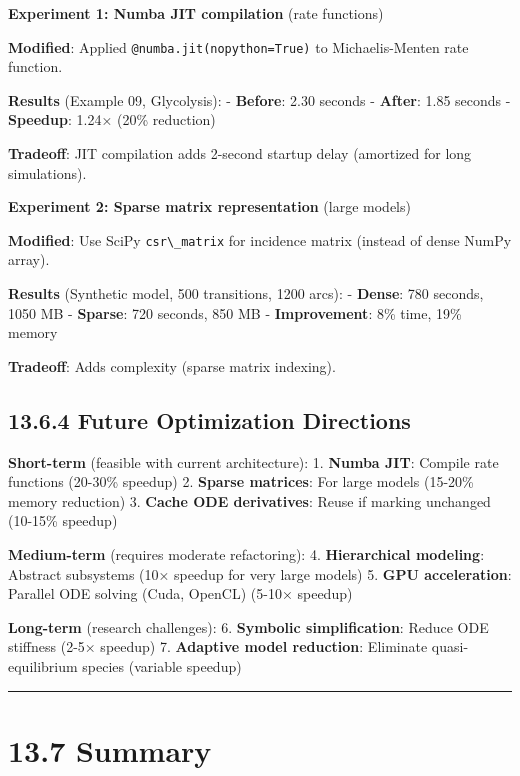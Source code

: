 \textbf{Experiment 1: Numba JIT compilation} (rate functions)

\textbf{Modified}: Applied
\passthrough{\lstinline!@numba.jit(nopython=True)!} to Michaelis-Menten
rate function.

\textbf{Results} (Example 09, Glycolysis): - \textbf{Before}: 2.30
seconds - \textbf{After}: 1.85 seconds - \textbf{Speedup}: 1.24× (20\%
reduction)

\textbf{Tradeoff}: JIT compilation adds 2-second startup delay
(amortized for long simulations).

\textbf{Experiment 2: Sparse matrix representation} (large models)

\textbf{Modified}: Use SciPy \passthrough{\lstinline!csr\_matrix!} for
incidence matrix (instead of dense NumPy array).

\textbf{Results} (Synthetic model, 500 transitions, 1200 arcs): -
\textbf{Dense}: 780 seconds, 1050 MB - \textbf{Sparse}: 720 seconds, 850
MB - \textbf{Improvement}: 8\% time, 19\% memory

\textbf{Tradeoff}: Adds complexity (sparse matrix indexing).

\hypertarget{future-optimization-directions}{%
\subsection{13.6.4 Future Optimization
Directions}\label{future-optimization-directions}}

\textbf{Short-term} (feasible with current architecture): 1.
\textbf{Numba JIT}: Compile rate functions (20-30\% speedup) 2.
\textbf{Sparse matrices}: For large models (15-20\% memory reduction) 3.
\textbf{Cache ODE derivatives}: Reuse if marking unchanged (10-15\%
speedup)

\textbf{Medium-term} (requires moderate refactoring): 4.
\textbf{Hierarchical modeling}: Abstract subsystems (10× speedup for
very large models) 5. \textbf{GPU acceleration}: Parallel ODE solving
(Cuda, OpenCL) (5-10× speedup)

\textbf{Long-term} (research challenges): 6. \textbf{Symbolic
simplification}: Reduce ODE stiffness (2-5× speedup) 7. \textbf{Adaptive
model reduction}: Eliminate quasi-equilibrium species (variable speedup)

\begin{center}\rule{0.5\linewidth}{0.5pt}\end{center}

\hypertarget{summary}{%
\section{13.7 Summary}\label{summary}}

